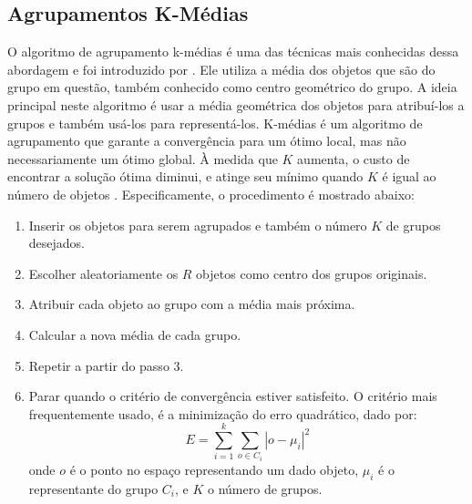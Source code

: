 \subsection{Agrupamentos K-Médias}
O algoritmo de agrupamento k-médias é uma das técnicas mais conhecidas dessa abordagem e foi introduzido por \cite{Macqueen67}. Ele utiliza a média dos objetos que são do grupo em questão, também conhecido como centro geométrico do grupo. A ideia principal neste algoritmo é usar a média geométrica dos objetos para atribuí-los a grupos e também usá-los para  representá-los.
K-médias é um algoritmo de agrupamento que garante a convergência para um ótimo local, mas não necessariamente um ótimo global. À medida que ${K}$ aumenta, o custo de encontrar a solução ótima diminui, e atinge seu mínimo quando ${K}$ é igual ao número de objetos \cite{Wu2008}. Especificamente, o procedimento é mostrado abaixo:
 \begin{enumerate}
	\item Inserir os objetos para serem agrupados e também o número ${K}$ de grupos desejados.
	\item Escolher aleatoriamente os ${R}$ objetos como centro dos grupos originais.
	\item Atribuir cada objeto ao grupo com a média mais próxima.
	\item Calcular a nova média de cada grupo.
	\item Repetir a partir do passo 3.
	\item Parar quando o critério de convergência estiver satisfeito. O critério mais frequentemente usado, é a minimização do erro quadrático, dado por: 
	\begin{equation}
	E = \sum_{i=1}^{k}\sum_{o\in C_{i}} |o - \mu_{i}|^{2}
	\end{equation}
	onde ${o}$ é o ponto no espaço representando um dado objeto, ${\mu_{i}}$ é o representante do grupo ${C_{i}}$,
	 e ${K}$ o número de grupos.
\end{enumerate}

